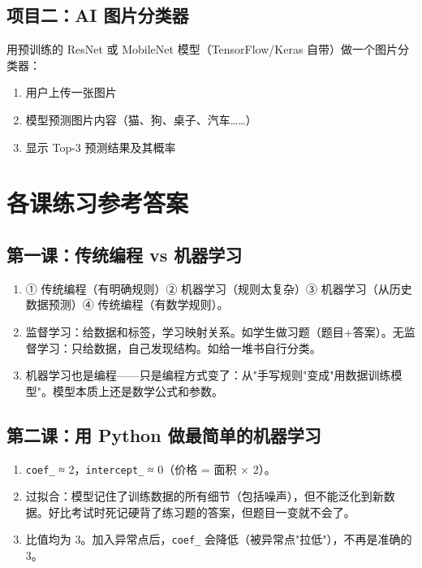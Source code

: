 \documentclass[a4paper,12pt]{ctexart}
\begin{document}
\subsection*{项目二：AI 图片分类器}

用预训练的 ResNet 或 MobileNet 模型（TensorFlow/Keras 自带）做一个图片分类器：

\begin{enumerate}
  \item 用户上传一张图片
  \item 模型预测图片内容（猫、狗、桌子、汽车……）
  \item 显示 Top-3 预测结果及其概率
\end{enumerate}

\section*{\textcolor{blue!70!black}{各课练习参考答案}}

\subsection*{第一课：传统编程 vs 机器学习}
\begin{enumerate}
  \item ① 传统编程（有明确规则）② 机器学习（规则太复杂）③ 机器学习（从历史数据预测）④ 传统编程（有数学规则）。
  \item 监督学习：给数据和标签，学习映射关系。如学生做习题（题目+答案）。无监督学习：只给数据，自己发现结构。如给一堆书自行分类。
  \item 机器学习也是编程——只是编程方式变了：从"手写规则"变成"用数据训练模型"。模型本质上还是数学公式和参数。
\end{enumerate}

\subsection*{第二课：用 Python 做最简单的机器学习}
\begin{enumerate}
  \item \texttt{coef\_} ≈ 2，\texttt{intercept\_} ≈ 0（价格 = 面积 × 2）。
  \item 过拟合：模型记住了训练数据的所有细节（包括噪声），但不能泛化到新数据。好比考试时死记硬背了练习题的答案，但题目一变就不会了。
  \item 比值均为 3。加入异常点后，\texttt{coef\_} 会降低（被异常点"拉低"），不再是准确的 3。
\end{enumerate}
\end{document}
